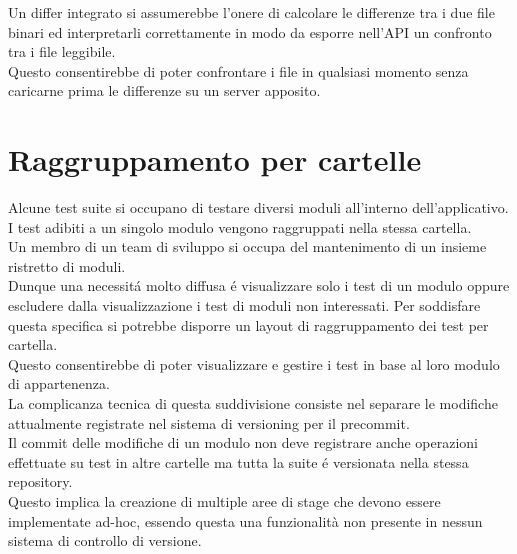         Un differ integrato si assumerebbe l'onere di calcolare le differenze tra i due file binari ed interpretarli correttamente in modo da esporre nell'API un confronto tra i file leggibile.\\
        Questo consentirebbe di poter confrontare i file in qualsiasi momento senza caricarne prima le differenze su un server apposito.
    \section{Raggruppamento per cartelle}
        Alcune test suite si occupano di testare diversi moduli all'interno dell'applicativo.\\
        I test adibiti a un singolo modulo vengono raggruppati nella stessa cartella.\\
        Un membro di un team di sviluppo si occupa del mantenimento di un insieme ristretto di moduli.\\
        Dunque una necessit\'a molto diffusa \'e visualizzare solo i test di un modulo oppure escludere dalla visualizzazione i test di moduli non interessati. 
        Per soddisfare questa specifica si potrebbe disporre un layout di raggruppamento dei test per cartella.\\
        Questo consentirebbe di poter visualizzare e gestire i test in base al loro modulo di appartenenza.\\ 

        La complicanza tecnica di questa suddivisione consiste nel separare le modifiche attualmente registrate nel sistema di versioning per il precommit.\\
        Il commit delle modifiche di un modulo non deve registrare anche operazioni effettuate su test in altre cartelle ma tutta la suite \'e versionata nella stessa repository.\\
        Questo implica la creazione di multiple aree di stage che devono essere implementate ad-hoc, essendo questa una funzionalità non presente in nessun sistema di controllo di versione.\\
